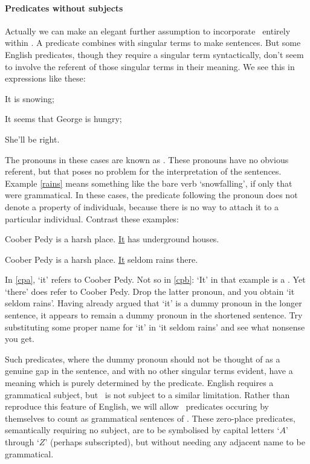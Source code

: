 \paragraph{Predicates without subjects} Actually we can make an elegant further assumption to incorporate \TFL\ entirely within \FOL. A predicate combines with singular terms to make sentences. But some English predicates, though they require a singular term syntactically, don't seem to involve the referent of those singular terms in their meaning. We see this in expressions like these: \begin{earg}
	\item[\ex{rains}] It is snowing;
	\item[\ex{seemss}] It seems that George is hungry;
	\item[\ex{shell}] She'll be right.
\end{earg} The pronouns in these cases are known as . These pronouns have no obvious referent, but that poses no problem for the interpretation of the sentences. Example \ref{rains} means something like the bare verb `snowfalling', if only that were grammatical. In these cases, the predicate following the pronoun does not denote a property of individuals, because there is no way to attach it to a particular individual.  Contrast these examples:  \begin{earg}
    \item[\ex{cpa}] Coober Pedy is a harsh place. \underline{It} has underground houses.
    	\item[\ex{cpb}] Coober Pedy is a harsh place. \underline{It} seldom rains there.
    \end{earg}
In \ref{cpa}, `it' refers to Coober Pedy. Not so in \ref{cpb}: `It' in that example is a . Yet `there' does refer to Coober Pedy. Drop the latter pronoun, and you obtain `it seldom rains'. Having already argued that `it' is a dummy pronoun in the longer sentence, it appears to remain a dummy pronoun in the shortened sentence. Try substituting some proper name for `it' in `it seldom rains' and see what nonsense you get. 

Such predicates, where the dummy pronoun should not be thought of as a genuine gap in the sentence, and with no other singular terms evident, have a meaning which is purely determined by the predicate. English requires a grammatical subject, but \FOL\ is not subject to a similar limitation. Rather than reproduce this feature of English, we will allow \FOL\ predicates occuring by themselves to count as grammatical sentences of \FOL. These zero-place predicates, semantically requiring no subject, are to be symbolised by capital letters `$A$' through `$Z$' (perhaps subscripted), but without needing any adjacent name to be grammatical.

